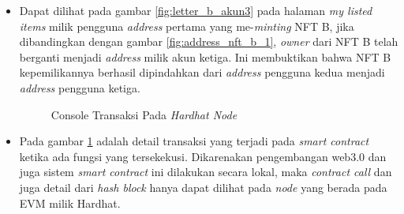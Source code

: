 \begin{itemize}
  \item Dapat dilihat pada gambar \ref*{fig:letter_b_akun3} pada halaman \emph{my listed items} milik pengguna \emph{address} pertama yang me-\emph{minting} NFT B, jika dibandingkan dengan gambar \ref*{fig:address_nft_b_1}, \emph{owner} dari NFT B telah berganti menjadi \emph{address} milik akun ketiga. Ini membuktikan bahwa NFT B kepemilikannya berhasil dipindahkan dari \emph{address} pengguna kedua menjadi \emph{address} pengguna ketiga.

  \begin{figure} [H] \centering
    \caption{Console Transaksi Pada \emph{Hardhat Node}}
    \label{fig:hardhat}
    \end{figure}

    \item Pada gambar \ref*{fig:hardhat} adalah detail transaksi yang terjadi pada \emph{smart contract} ketika ada fungsi yang tersekekusi. Dikarenakan pengembangan web3.0 dan juga sistem \emph{smart contract} ini dilakukan secara lokal, maka \emph{contract call} dan juga detail dari \emph{hash block} hanya dapat dilihat pada \emph{node} yang berada pada EVM milik Hardhat.
    

\end{itemize}

